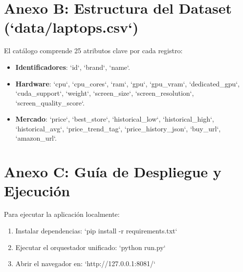 \section{Anexo B: Estructura del Dataset (`data/laptops.csv`)}
El catálogo comprende 25 atributos clave por cada registro:
\begin{itemize}
    \item \textbf{Identificadores}: `id`, `brand`, `name`.
    \item \textbf{Hardware}: `cpu`, `cpu_cores`, `ram`, `gpu`, `gpu_vram`, `dedicated_gpu`, `cuda_support`, `weight`, `screen_size`, `screen_resolution`, `screen_quality_score`.
    \item \textbf{Mercado}: `price`, `best_store`, `historical_low`, `historical_high`, `historical_avg`, `price_trend_tag`, `price_history_json`, `buy_url`, `amazon_url`.
\end{itemize}

\section{Anexo C: Guía de Despliegue y Ejecución}
Para ejecutar la aplicación localmente:
\begin{enumerate}
    \item Instalar dependencias: `pip install -r requirements.txt`
    \item Ejecutar el orquestador unificado: `python run.py`
    \item Abrir el navegador en: `http://127.0.0.1:8081/`
\end{enumerate}